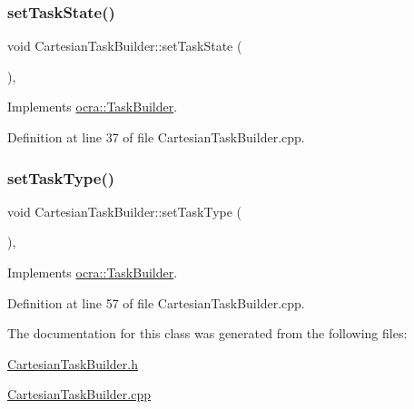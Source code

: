 \subsubsection{\texorpdfstring{set\+Task\+State()}{setTaskState()}}
{\footnotesize\ttfamily void Cartesian\+Task\+Builder\+::set\+Task\+State (\begin{DoxyParamCaption}{ }\end{DoxyParamCaption})\hspace{0.3cm}{\ttfamily [protected]}, {\ttfamily [virtual]}}



Implements \hyperlink{classocra_1_1TaskBuilder_a7b44bfa101566ea4400e2d9bfdb9ff32}{ocra\+::\+Task\+Builder}.



Definition at line 37 of file Cartesian\+Task\+Builder.\+cpp.

\hypertarget{classocra_1_1CartesianTaskBuilder_a679842b95d6f7296a466636fd21bbbb8}{}\label{classocra_1_1CartesianTaskBuilder_a679842b95d6f7296a466636fd21bbbb8} 
\subsubsection{\texorpdfstring{set\+Task\+Type()}{setTaskType()}}
{\footnotesize\ttfamily void Cartesian\+Task\+Builder\+::set\+Task\+Type (\begin{DoxyParamCaption}{ }\end{DoxyParamCaption})\hspace{0.3cm}{\ttfamily [protected]}, {\ttfamily [virtual]}}



Implements \hyperlink{classocra_1_1TaskBuilder_a1a979fc495be6dc30483aa8fd0ff2650}{ocra\+::\+Task\+Builder}.



Definition at line 57 of file Cartesian\+Task\+Builder.\+cpp.



The documentation for this class was generated from the following files\+:\begin{DoxyCompactItemize}
\item 
\hyperlink{CartesianTaskBuilder_8h}{Cartesian\+Task\+Builder.\+h}\item 
\hyperlink{CartesianTaskBuilder_8cpp}{Cartesian\+Task\+Builder.\+cpp}\end{DoxyCompactItemize}
